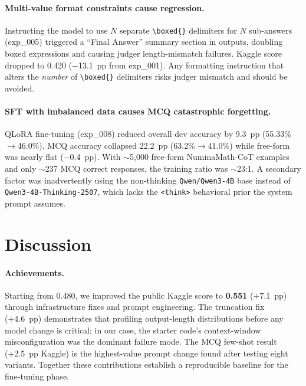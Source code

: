 \documentclass{article}
\begin{document}
\paragraph{Multi-value format constraints cause regression.}
Instructing the model to use $N$ separate \verb|\boxed{}| delimiters for $N$ sub-answers (exp\_005) triggered a ``Final Answer'' summary section in outputs, doubling boxed expressions and causing judger length-mismatch failures. Kaggle score dropped to 0.420 ($-$13.1~pp from exp\_001). Any formatting instruction that alters the \emph{number} of \verb|\boxed{}| delimiters risks judger mismatch and should be avoided.

\paragraph{SFT with imbalanced data causes MCQ catastrophic forgetting.}
QLoRA fine-tuning (exp\_008) reduced overall dev accuracy by 9.3~pp (55.33\%$\to$46.0\%). MCQ accuracy collapsed 22.2~pp (63.2\%$\to$41.0\%) while free-form was nearly flat ($-$0.4~pp). With ${\sim}$5,000 free-form NuminaMath-CoT examples and only ${\sim}$237 MCQ correct responses, the training ratio was ${\sim}$23:1. A secondary factor was inadvertently using the non-thinking \texttt{Qwen/Qwen3-4B} base instead of \texttt{Qwen3-4B-Thinking-2507}, which lacks the \verb|<think>| behavioral prior the system prompt assumes.


\section{Discussion}
\label{sec:discussion}

\paragraph{Achievements.}
Starting from 0.480, we improved the public Kaggle score to \textbf{0.551} (+7.1~pp) through infrastructure fixes and prompt engineering. The truncation fix (+4.6~pp) demonstrates that profiling output-length distributions before any model change is critical; in our case, the starter code's context-window misconfiguration was the dominant failure mode. The MCQ few-shot result (+2.5~pp Kaggle) is the highest-value prompt change found after testing eight variants. Together these contributions establish a reproducible baseline for the fine-tuning phase.
\end{document}
